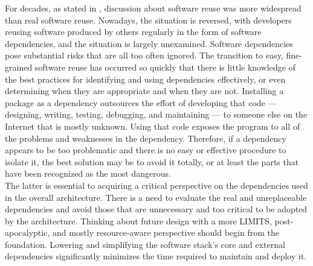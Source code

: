 For decades, as stated in \cite{software_dependency_problem}, discussion about
software reuse was more widespread than real software reuse. Nowadays, the
situation is reversed, with developers reusing software produced by others regularly
in the form of software dependencies, and the situation is largely unexamined. Software
dependencies pose substantial risks that are all too often ignored. The
transition to easy, fine-grained software reuse has occurred so quickly that there
is little knowledge of the best practices for identifying and using dependencies
effectively, or even determining when they are appropriate and when they are not.
Installing a package as a dependency outsources the effort of developing that code
--- designing, writing, testing, debugging, and maintaining --- to someone else on
the Internet that is mostly unknown. Using that code exposes the program to all
of the problems and weaknesses in the dependency. Therefore, if a dependency
appears to be too problematic and there is no easy or effective procedure to
isolate it, the best solution may be to avoid it totally, or at least the parts
that have been recognized as the most dangerous. \\ %
The latter is essential to acquiring a critical perspective on the dependencies
used in the overall architecture. There is a need to evaluate the real and unreplaceable
dependencies and avoid those that are unnecessary and too critical to be adopted
by the architecture. Thinking about future design with a more LIMITS, post-apocalyptic,
and mostly resource-aware perspective should begin from the foundation. Lowering
and simplifying the software stack's core and external dependencies significantly
minimizes the time required to maintain and deploy it.